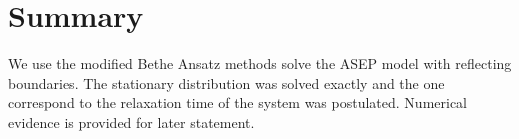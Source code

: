 \documentclass[12pt,a4paper]{article}
\begin{document}
\section{Summary}
\label{sec:summeary}
We use the modified Bethe Ansatz methods solve the ASEP model with reflecting
boundaries.  The stationary distribution was solved exactly and the one
correspond to the relaxation time of the system was postulated. Numerical
evidence is provided for later statement.


% 
 
\end{document}
